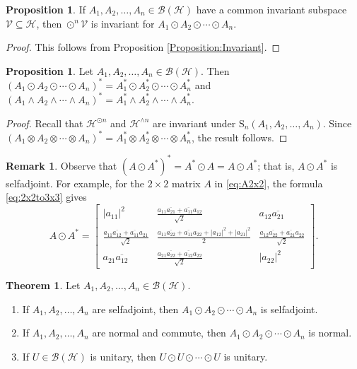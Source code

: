 \documentclass[10pt,reqno]{amsart}
\newcommand{\0}{{\color{lightgray}0}}
\renewcommand{\S}{\mathrm{S}}
\newcommand{\B}{\mathcal{B}}
\newcommand{\h}{\mathcal{H}}
\theoremstyle{definition}
\newtheorem{Theorem}[equation]{Theorem}
\newtheorem{Proposition}[equation]{Proposition}
\newtheorem{Remark}[equation]{Remark}
\numberwithin{equation}{section}
\begin{document}
\begin{Proposition}\label{Prop:CommonInvariant}
If $A_1, A_2,  \ldots, A_n \in \mathcal{B} (\h)$ have a common invariant subspace $\mathcal{V} \subseteq \h$, then $\odot^n \mathcal{V}$ is invariant for $A_1 \odot A_2 \odot \cdots \odot A_n$.
\end{Proposition}
\begin{proof}
    This follows from Proposition \ref{Proposition:Invariant}.
\end{proof}




\begin{Proposition}\label{Proposition:Adjoint}
Let $A_1,A_2,\ldots,A_n \in \B(\h)$.  Then
$(A_1 \odot A_2 \odot \cdots \odot A_n)^*  = A_1^* \odot A_2^*\odot \cdots \odot A_n^*$
and
$(A_1 \wedge A_2 \wedge \cdots \wedge A_n)^* = A_1^* \wedge A_2^*\wedge \cdots \wedge A_n^*$.
\end{Proposition}

\begin{proof}
Recall that $\h^{\odot n}$ and $\h^{\wedge n}$ are invariant under
$\S_n(A_1,A_2,\ldots,A_n)$.  Since
$(A_1 \otimes A_2 \otimes \cdots \otimes A_n)^* = A_1^* \otimes A_2^* \otimes \cdots \otimes A_n^*$,
the result follows.
\end{proof}



\begin{Remark}\label{Remark:AAStar}
Observe that $(A \odot A^*)^* = A^* \odot A = A \odot A^*$; that is, $A \odot A^*$ is selfadjoint. For example, for the
 $2 \times 2$ matrix $A$ in \eqref{eq:A2x2}, the formula \eqref{eq:2x2to3x3} gives
\begin{equation}
A \odot A^* = \begin{bmatrix}
|a_{11}|^2 &\frac{a_{11} \overline{a_{21}} + \overline{a_{11}}a_{12}}{\sqrt{2}} &  a_{12}\overline{a_{21}} \\
\frac{a_{11} \overline{a_{12}} + \overline{a_{11}}a_{21}}{\sqrt{2}}& \frac{a_{11} \overline{a_{22}} + \overline{a_{11}}a_{22} + |a_{12}|^2 + |a_{21}|^2}{2} & \frac{a_{12} \overline{a_{22}} + \overline{a_{21}}a_{22}}{\sqrt{2}} \\
a_{21}\overline{a_{12}}& \frac{a_{21} \overline{a_{22}} + \overline{a_{12}}a_{22}}{\sqrt{2}} & |a_{22}|^2
\end{bmatrix} .
\end{equation}
\end{Remark}

\begin{Theorem}\label{Theorem:Closure}
Let $A_1,A_2,\ldots,A_n\in \B(\h)$.
\begin{enumerate}
\item If $A_1,A_2,\ldots,A_n$ are selfadjoint, then $A_1 \odot A_2 \odot \cdots \odot A_n$ is selfadjoint.
\item If $A_1,A_2,\ldots,A_n$ are normal and commute, then $A_1 \odot A_2 \odot \cdots \odot A_n$ is normal.
\item If $U \in \B(\h)$ is unitary, then $U \odot U \odot \cdots \odot U$ is unitary.
\end{enumerate}
\end{Theorem}
\end{document}
